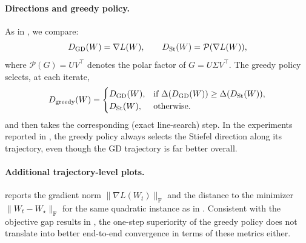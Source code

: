 \documentclass{article}
\theoremstyle{plain}
\theoremstyle{definition}
\theoremstyle{remark}
\newcommand{\loss}{L}
\newcommand{\proj}{\mathcal{P}}
\newcommand{\Svnn}{{\Sigma}} %
\newcommand{\GD}{\textsc{GD}}
\begin{document}


\paragraph{Directions and greedy policy.}
As in , we compare:
\[
D_{\rm GD}(W)=\nabla \loss(W),
\qquad
D_{\rm St}(W)=\proj(\nabla \loss(W)),
\]
where $\proj(G)=UV^\top$ denotes the polar factor of $G=U\Svnn V^\top$.
The greedy policy selects, at each iterate, 
\[
D_{\rm greedy}(W)=
\begin{cases}
D_{\rm GD}(W), & \text{if }\Delta(D_{\rm GD}(W))\ge \Delta(D_{\rm St}(W)),\\
D_{\rm St}(W), & \text{otherwise.}
\end{cases}
\]
and then takes the corresponding (exact line-search) step.
In the experiments reported in , the greedy policy always selects the Stiefel direction along its trajectory,
even though the \GD{} trajectory is far better overall.




\paragraph{Additional trajectory-level plots.}
 reports the gradient norm
$\|\nabla \loss(W_t)\|_{\mathrm{F}}$ and the distance to the minimizer
$\|W_t-W_\star\|_{\mathrm{F}}$
for the same quadratic instance as in .
Consistent with the objective gap results in ,  
the one-step superiority of the greedy policy does not translate 
into better end-to-end convergence in terms of these metrics either. 
\end{document}
